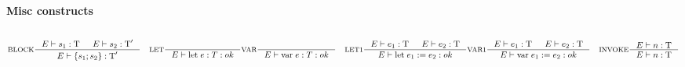 \paragraph{Misc constructs}
\begin{align*}
\intertext{}
&\inference[BLOCK]{\Tenv s_1: \Tt & \Tenv s_2: \Tt'}
                 {\Tenv \{s_1; s_2\} : \Tt'}
&\inference[LET]{}
                 {\Tenv \mathbin{\text{let}} \; e:T: ok}
&\inference[VAR]{}
                 {\Tenv \mathbin{\text{var}} \; e:T: ok}
&\inference[LET1]{\Tenv e_1: \Tt & \Tenv e_2: \Tt}
                 {\Tenv \mathbin{\text{let}} \; e_1 := e_2: ok}
&\inference[VAR1]{\Tenv e_1: \Tt & \Tenv e_2: \Tt}
                 {\Tenv \mathbin{\text{var}} \; e_1 := e_2: ok}
&\inference[INVOKE]{\Tenv n: \Tt}
                 {\Tenv n: \Tt}
\end{align*}